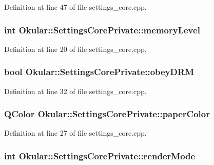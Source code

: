 Definition at line 47 of file settings\+\_\+core.\+cpp.

\hypertarget{classOkular_1_1SettingsCorePrivate_a904bfb6bd05666c2ba7d3d69b74f91ea}{
\subsubsection[{memory\+Level}]{\setlength{\rightskip}{0pt plus 5cm}int Okular\+::\+Settings\+Core\+Private\+::memory\+Level}}\label{classOkular_1_1SettingsCorePrivate_a904bfb6bd05666c2ba7d3d69b74f91ea}


Definition at line 20 of file settings\+\_\+core.\+cpp.

\hypertarget{classOkular_1_1SettingsCorePrivate_a7c937970be4909da5e6c87b808508ff7}{
\subsubsection[{obey\+D\+R\+M}]{\setlength{\rightskip}{0pt plus 5cm}bool Okular\+::\+Settings\+Core\+Private\+::obey\+D\+R\+M}}\label{classOkular_1_1SettingsCorePrivate_a7c937970be4909da5e6c87b808508ff7}


Definition at line 32 of file settings\+\_\+core.\+cpp.

\hypertarget{classOkular_1_1SettingsCorePrivate_ad7b5c7af2f0c3beb1de8ffa6eb419d55}{
\subsubsection[{paper\+Color}]{\setlength{\rightskip}{0pt plus 5cm}Q\+Color Okular\+::\+Settings\+Core\+Private\+::paper\+Color}}\label{classOkular_1_1SettingsCorePrivate_ad7b5c7af2f0c3beb1de8ffa6eb419d55}


Definition at line 27 of file settings\+\_\+core.\+cpp.

\hypertarget{classOkular_1_1SettingsCorePrivate_adee868b29bdba3ccd3c199b2ad05a0f9}{
\subsubsection[{render\+Mode}]{\setlength{\rightskip}{0pt plus 5cm}int Okular\+::\+Settings\+Core\+Private\+::render\+Mode}}\label{classOkular_1_1SettingsCorePrivate_adee868b29bdba3ccd3c199b2ad05a0f9}


